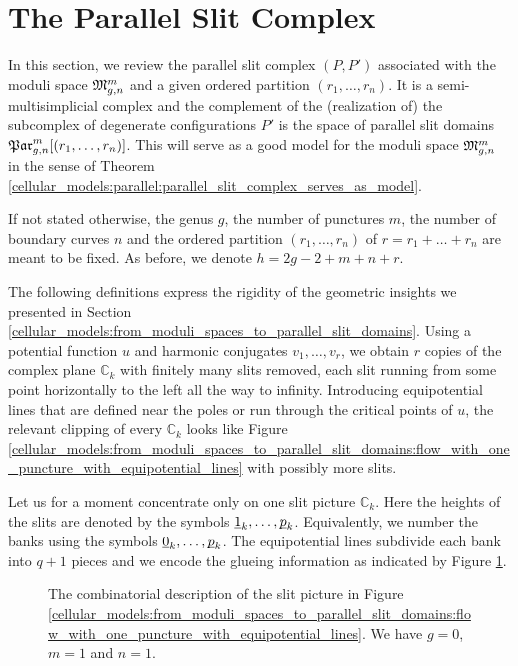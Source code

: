 \section{The Parallel Slit Complex}
\label{cellular_models:parallel}

In this section, we review the parallel slit complex $(P,P')$ associated with the moduli space $\mathfrak{M}^m_{g,n}$ and a given ordered partition $(r_1, \ldots, r_n)$.
It is a semi-multisimplicial complex and the complement of the (realization of) the subcomplex of degenerate configurations $P'$ is the space of parallel slit domains $\Parr$.
This will serve as a good model for the moduli space $\mathfrak{M}^m_{g,n}$ in the sense of Theorem \ref{cellular_models:parallel:parallel_slit_complex_serves_as_model}.

If not stated otherwise, the genus $g$, the number of punctures $m$, the number of boundary curves $n$ and
the ordered partition $(r_1, \ldots, r_n)$ of $r = r_1 + \ldots + r_n$ are meant to be fixed.
As before, we denote $h = 2g - 2 + m + n + r$.

The following definitions express the rigidity of the geometric insights we presented in Section \ref{cellular_models:from_moduli_spaces_to_parallel_slit_domains}.
Using a potential function $u$ and harmonic conjugates $v_1, \ldots ,v_r$, 
we obtain $r$ copies of the complex plane $\mathbb C_k$ with finitely many slits removed,
each slit running from some point horizontally to the left all the way to infinity.
Introducing equipotential lines that are defined near the poles or run through the critical points of $u$, 
the relevant clipping of every $\mathbb C_k$ looks like Figure \ref{cellular_models:from_moduli_spaces_to_parallel_slit_domains:flow_with_one_puncture_with_equipotential_lines}
with possibly more slits.

Let us for a moment concentrate only on one slit picture $\mathbb C_k$.
Here the heights of the slits are denoted by the symbols $\ul 1_k, \ldots, \ul p_k$.
Equivalently, we number the banks using the symbols $\ul 0_k, \ldots, \ul p_k$.
The equipotential lines subdivide each bank into $q+1$ pieces and we encode the glueing information as indicated by Figure \ref{cellular_models:parallel:introduce_symbols}.
\begin{figure}[ht]
\centering
{}
\caption{\label{cellular_models:parallel:introduce_symbols}
    The combinatorial description of the slit picture in Figure \ref{cellular_models:from_moduli_spaces_to_parallel_slit_domains:flow_with_one_puncture_with_equipotential_lines}.
    We have $g=0$, $m=1$ and $n=1$.}
\end{figure}

